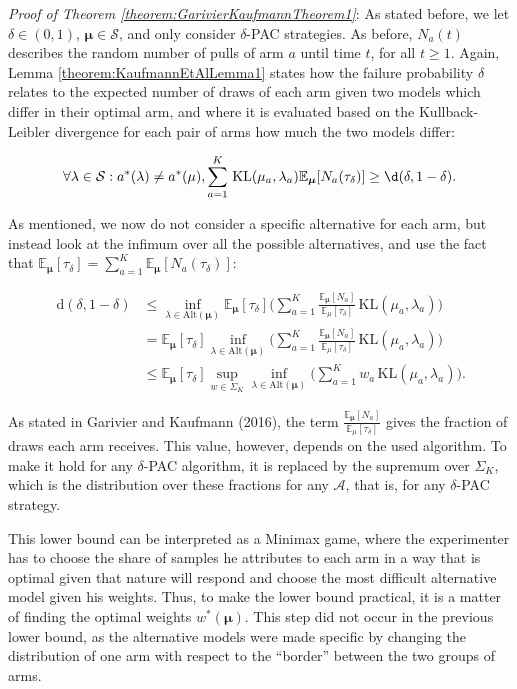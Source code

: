 \documentclass[12pt,]{article}
\newcommand{\KL}{\,\text{KL}}
\newcommand{\der}{\,\text{d}}
\begin{document}
\emph{Proof of Theorem \ref{theorem:GarivierKaufmannTheorem1}}: As
stated before, we let \(\delta \in (0,1)\),
\(\bm{\mu} \in \mathcal{S}\), and only consider \(\delta\)-PAC
strategies. As before, \(N_a(t)\) describes the random number of pulls
of arm \(a\) until time \(t\), for all \(t\geq 1\). Again, Lemma
\ref{theorem:KaufmannEtAlLemma1} states how the failure probability
\(\delta\) relates to the expected number of draws of each arm given two
models which differ in their optimal arm, and where it is evaluated
based on the Kullback-Leibler divergence for each pair of arms how much
the two models differ:

\begin{equation*}
\forall \lambda \in \mathcal{S}: a^*(\lambda) \neq a^*(\mu), \sum_{a=1}^K \KL(\mu_a,\lambda_a)\mathbb{E}_{\bm{\mu}}[N_a(\tau_{\delta})] \geq \d(\delta, 1- \delta).
\end{equation*}

As mentioned, we now do not consider a specific alternative for each
arm, but instead look at the infimum over all the possible alternatives,
and use the fact that
\(\mathbb{E}_{\bm{\mu}}[\tau_{\delta}] = \sum_{a=1}^K \mathbb{E}_{\bm{\mu}}[N_a(\tau_{\delta})]\):

\begin{align*}
\der(\delta, 1-\delta) & \leq \inf_{\lambda \in \text{Alt}(\bm{\mu})} \mathbb{E}_{\bm{\mu}}[\tau_{\delta}] \Big(\sum_{a=1}^K \frac{\mathbb{E}_{\bm{\mu}}[N_a]}{\mathbb{E}_{\mu}[\tau_{\delta}]} \KL(\mu_a, \lambda_a)\Big) \\
& = \mathbb{E}_{\bm{\mu}}[\tau_{\delta}] \inf_{\lambda \in \text{Alt}(\bm{\mu})} \Big(\sum_{a=1}^K \frac{\mathbb{E}_{\bm{\mu}}[N_a]}{\mathbb{E}_{\mu}[\tau_{\delta}]} \KL(\mu_a, \lambda_a)\Big) \\
& \leq \mathbb{E}_{\bm{\mu}}[\tau_{\delta}] \sup_{w \in \Sigma_K} \inf_{\lambda \in \text{Alt}(\bm{\mu})} \Big(\sum_{a=1}^K w_a \KL(\mu_a, \lambda_a)\Big).
\end{align*}

As stated in Garivier and Kaufmann (2016), the term
\(\frac{\mathbb{E}_{\bm{\mu}}[N_a]}{\mathbb{E}_{\mu}[\tau_{\delta}]}\)
gives the fraction of draws each arm receives. This value, however,
depends on the used algorithm. To make it hold for any \(\delta\)-PAC
algorithm, it is replaced by the supremum over \(\Sigma_K\), which is
the distribution over these fractions for any \(\mathcal{A}\), that is,
for any \(\delta\)-PAC strategy.

This lower bound can be interpreted as a Minimax game, where the
experimenter has to choose the share of samples he attributes to each
arm in a way that is optimal given that nature will respond and choose
the most difficult alternative model given his weights. Thus, to make
the lower bound practical, it is a matter of finding the optimal weights
\(w^*(\bm{\mu})\). This step did not occur in the previous lower bound,
as the alternative models were made specific by changing the
distribution of one arm with respect to the ``border'' between the two
groups of arms.
\end{document}
